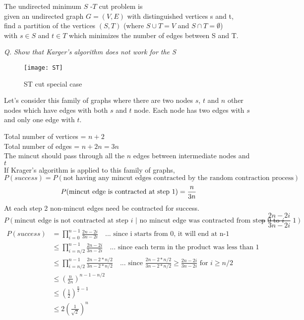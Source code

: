 \documentclass{homeworg}
\begin{document}
\newpage
\exercise
The undirected minimum $S$ -$T$ cut problem is \\
given an undirected graph $G =(V,E)$ with distinguished vertices s and t, \\
find a partition of the vertices $(S,T)$ (where $S \cup T = V$ and $S \cap T = \emptyset$) \\
with $s \in S$ and $t \in T$ which minimizes the number of edges between S and T.

\emph{Q. Show that Karger’s algorithm does not work for the S }

\begin{figure}[h]
    \centering
    \texttt{[image: ST]}
    \caption{ST cut special case}
    \label{fig:ST}
\end{figure}

Let's consider this family of graphs where there are two nodes $s$, $t$ and $n$ other nodes which have edges with both $s$ and $t$ node. Each node has two edges with $s$ and only one edge with $t$.

Total number of vertices = $n+2$\\
Total number of edges = $n + 2n = 3n$\\
The mincut should pass through all the $n$ edges between intermediate nodes and $t$\\
If Krager's algorithm is applied to this family of graphs, \\
\[
P(success) = P(\text{not having any mincut edges contracted by the random contraction process}) 
\]
\[
P (\text{mincut edge is contracted at step 1}) = \frac{n}{3n}\\
\]
At each step 2 non-mincut edges need be contracted for success.
\[
P (\text{mincut edge is not contracted at step $i$ | no mincut edge was contracted from step $0$ to $i-1$}) = \frac{2n-2i}{3n-2i}
\]
\begin{align*}
    P(success) &= \prod_{i=0}^{n-1} \frac{2n-2i}{3n-2i} \quad \text{... since i starts from 0, it will end at n-1}\\
    & \leq \prod_{i=n/2}^{n-1} \frac{2n-2i}{3n-2i} \quad \text{... since each term in the product was less than 1}\\
    & \leq \prod_{i=n/2}^{n-1} \frac{2n-2\ast n/2}{3n-2\ast n/2} \quad \text{... since } \frac{2n-2\ast n/2}{3n-2\ast n/2} \geq \frac{2n-2i}{3n-2i} \text{ for } i \geq n/2\\
    & \leq \left(\frac{n}{2n}\right)^{n-1-n/2}\\
    & \leq \left(\frac{1}{2}\right)^{\frac{n}{2}-1}\\
    & \leq 2 \left(\frac{1}{\surd{2}}\right)^n
\end{align*}
\end{document}
